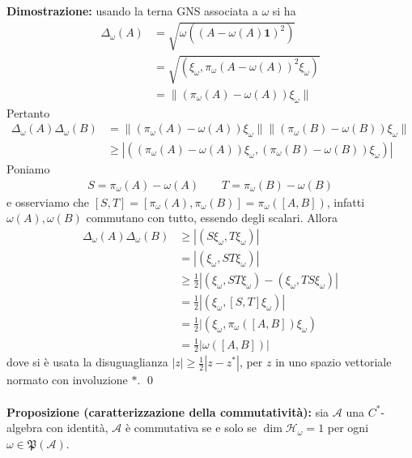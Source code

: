 \documentclass{article}
\numberwithin{equation}{subsection}
\begin{document}
\textbf{Dimostrazione:} usando la terna GNS associata a $\omega$ si ha
\begin{align*}
    \Delta_\omega(A) &= \sqrt{\omega((A - \omega(A)\mathbf{1})^2)} \\
    &= \sqrt{(\xi_\omega, \pi_\omega(A - \omega(A))^2\xi_\omega)} \\
    &= \|(\pi_\omega(A) - \omega(A))\xi_\omega\|
\end{align*}
Pertanto
\begin{align*}
    \Delta_\omega(A)\Delta_\omega(B) &= \|(\pi_\omega(A) - \omega(A))\xi_\omega\|\|(\pi_\omega(B) - \omega(B))\xi_\omega\| \\
    &\geq |((\pi_\omega(A) - \omega(A))\xi_\omega, (\pi_\omega(B) - \omega(B))\xi_\omega)|
\end{align*}
Poniamo 
\begin{align*}
    S = \pi_\omega(A) - \omega(A) \qquad T = \pi_\omega(B) - \omega(B)
\end{align*}
e osserviamo che $[S, T] = [\pi_\omega(A), \pi_\omega(B)] = \pi_\omega([A, B])$, infatti $\omega(A), \omega(B)$ commutano con tutto, essendo degli scalari. Allora
\begin{align*}
    \Delta_\omega(A)\Delta_\omega(B) &\geq |(S\xi_\omega, T\xi_\omega)| \\
    &= |(\xi_\omega, ST\xi_\omega)| \\
    &\geq \frac{1}{2}|(\xi_\omega, ST\xi_\omega) - (\xi_\omega, TS\xi_\omega)| \\
    &= \frac{1}{2}|(\xi_\omega, [S, T]\xi_\omega)| \\
    &= \frac{1}{2}|(\xi_\omega, \pi_\omega([A, B])\xi_\omega) \\
    &= \frac{1}{2}|\omega([A, B])|
\end{align*}
dove si è usata la disuguaglianza $|z| \geq \frac{1}{2}|z - z^*|$, per $z$ in uno spazio vettoriale normato con involuzione $*$. \qed \\ \\
\textbf{Proposizione (caratterizzazione della commutatività):} sia $\mathscr{A}$ una $C^*$-algebra con identità, $\mathscr{A}$ è commutativa se e solo se $\dim \mathcal{H}_\omega = 1$ per ogni $\omega \in \mathfrak{P}(\mathscr{A})$. \\
\end{document}
